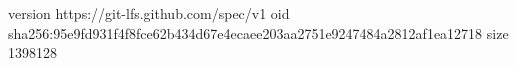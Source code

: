 version https://git-lfs.github.com/spec/v1
oid sha256:95e9fd931f4f8fce62b434d67e4ecaee203aa2751e9247484a2812af1ea12718
size 1398128
